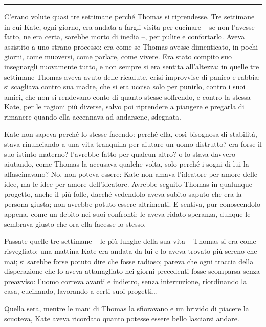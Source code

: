 \plainbreak{1}

C'erano volute quasi tre settimane perché Thomas si riprendesse. Tre settimane in cui Kate, ogni
giorno, era andata a fargli visita per cucinare -- se non l'avesse fatto, ne era certa, sarebbe
morto di inedia --, per pulire e confortarlo. Aveva assistito a uno strano processo: era come se
Thomas avesse dimenticato, in pochi giorni, come muoversi, come parlare, come vivere. Era stato
compito suo insegnargli nuovamente tutto, e non sempre si era sentita all'altezza: in quelle tre
settimane Thomas aveva avuto delle ricadute, crisi improvvise di panico e rabbia: si scagliava
contro sua madre, che si era uccisa solo per punirlo, contro i suoi amici, che non si rendevano
conto di quanto stesse soffrendo, e contro la stessa Kate, per le ragioni più diverse, salvo poi
riprendere a piangere e pregarla di rimanere quando ella accennava ad andarsene, sdegnata.

Kate non sapeva perché lo stesse facendo: perché ella, così bisognosa di stabilità, stava
rinunciando a una vita tranquilla per aiutare un uomo distrutto? era forse il suo istinto materno?
l'avrebbe fatto per qualcun altro? o lo stava davvero aiutando, come Thomas la accusava qualche
volta, solo perché i sogni di lui la affascinavano? No, non poteva essere: Kate non amava l'ideatore
per amore delle idee, ma le idee per amore dell'ideatore. Avrebbe seguito Thomas in qualunque
progetto, anche il più folle, dacché vedendolo aveva subito saputo che era la persona giusta; non
avrebbe potuto essere altrimenti. E sentiva, pur conoscendolo appena, come un debito nei suoi
confronti: le aveva ridato speranza, dunque le sembrava giusto che ora ella facesse lo stesso.

Passate quelle tre settimane -- le più lunghe della sua vita -- Thomas si era come risvegliato: una
mattina Kate era andata da lui e lo aveva trovato più sereno che mai; si sarebbe forse potuto dire
che fosse radioso; pareva che ogni traccia della disperazione che lo aveva attanagliato nei giorni
precedenti fosse scomparsa senza preavviso: l'uomo correva avanti e indietro, senza interruzione,
riordinando la casa, cucinando, lavorando a certi suoi progetti\dots

Quella sera, mentre le mani di Thomas la sfioravano e un brivido di piacere la scuoteva, Kate aveva
ricordato quanto potesse essere bello lasciarsi andare.
